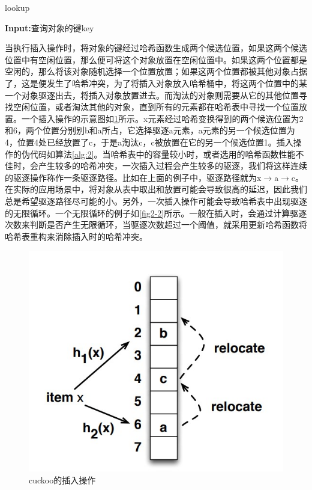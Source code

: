 \documentclass[supercite]{Experimental_Report}
\theoremstyle{definition}
\begin{document}
\begin{algorithm}[h]
	\caption{lookup}
    {\bf Input:}查询对象的键key
	\begin{algorithmic}[1]
        \Else
        \EndIf
	\end{algorithmic}\label{alg:1}
\end{algorithm}

当执行插入操作时，将对象的键经过哈希函数生成两个候选位置，如果这两个候选位置中有空闲位置，那么便可将这个对象放置在空闲位置中。如果这两个位置都是空闲的，那么将该对象随机选择一个位置放置；如果这两个位置都被其他对象占据了，这是便发生了哈希冲突，为了将插入对象放入哈希桶中，将这两个位置中的某一个对象驱逐出去，将插入对象放置进去。而淘汰的对象则需要从它的其他位置寻找空闲位置，或者淘汰其他的对象，直到所有的元素都在哈希表中寻找一个位置放置。一个插入操作的示意图如\ref{fig2-1}所示。x元素经过哈希变换得到的两个候选位置为2和6，两个位置分别别b和a所占，它选择驱逐a元素，a元素的另一个候选位置为4，位置4处已经放置了c，于是a淘汰c，c被放置在它的另一个候选位置1。插入操作的伪代码如算法\ref{alg:2}。当哈希表中的容量较小时，或者选用的哈希函数性能不佳时，会产生较多的哈希冲突，一次插入过程会产生较多的驱逐，我们将这样连续的驱逐操作称作一条驱逐路径。比如在上面的例子中，驱逐路径就为x$\rightarrow$a$\rightarrow$c。在实际的应用场景中，将对象从表中取出和放置可能会导致很高的延迟，因此我们总是希望驱逐路径尽可能的小。另外，一次插入操作可能会导致哈希表中出现驱逐的无限循环。一个无限循环的例子如\ref{fig2-2}所示。一般在插入时，会通过计算驱逐次数来判断是否产生无限循环，当驱逐次数超过一个阈值，就采用更新哈希函数将哈希表重构来消除插入时的哈希冲突。

\begin{figure}[htb]
	\begin{center}
		\includegraphics[scale=0.7]{./images/normol_insert.jpg}
		\caption{cuckoo的插入操作}
		\label{fig2-1}
	\end{center}
\end{figure}
\end{document}
